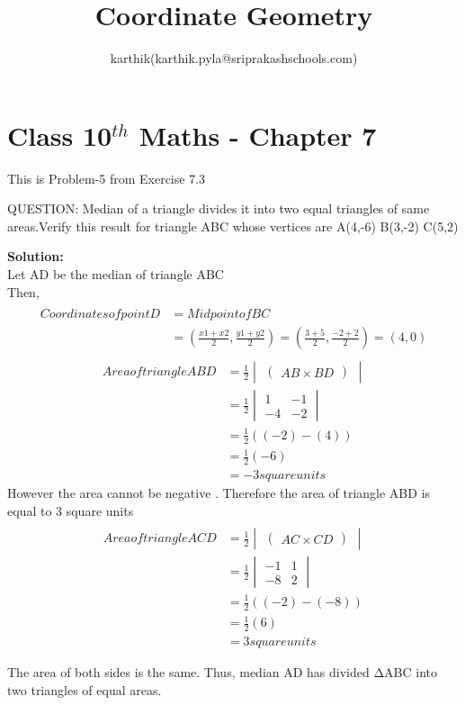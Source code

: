 \documentclass[12pt]{article}
\title{Coordinate Geometry}
\author{karthik(karthik.pyla@sriprakashschools.com)}
\newcommand{\myvec}[1]{\ensuremath{\begin{pmatrix}#1\end{pmatrix}}}
\newcommand{\mydet}[1]{\ensuremath{\begin{vmatrix}#1\end{vmatrix}}}
\newcommand{\solution}{\noindent \textbf{Solution: }}
\begin{document}
\maketitle
\section*{Class 10$^{th}$ Maths - Chapter 7}
This is Problem-5 from Exercise 7.3
\item  QUESTION: Median of a triangle divides it into two equal triangles of same areas.Verify this result for triangle ABC whose vertices are A(4,-6) B(3,-2) C(5,2)




\solution \\
Let AD be the median of triangle ABC\\
Then,
\begin{align}
\\Coordinates of point D &= Midpoint of BC\\    
&=\left(\frac{x1+x2}{2},\frac{y1+y2}{2}\right)
=\left(\frac{3+5}{2},\frac{-2+2}{2}\right)=(4,0)
\end{align}
\begin{align}
\\Area of triangle ABD&=\frac{1}{2}\mydet{ \myvec {AB\times BD}}\\&=\frac{1}{2}\mydet{ {1}&{-1} \\{-4}&{-2}}\\ &=\frac{1}{2}\left((-2)-(4)\right)\\&=\frac{1}{2}(-6)\\&=-3 square units
\end{align}
However the area cannot be negative . Therefore the area of triangle ABD is equal to 3 square units
\begin{align}
\\Area of triangle ACD&=\frac{1}{2}\mydet{ \myvec {AC\times CD}}\\&=\frac{1}{2}\mydet{ {-1}&{1} \\{-8}&{2}}\\ &=\frac{1}{2}\left((-2)-(-8)\right)\\&=\frac{1}{2}(6)\\&=3 square units
\end{align}

The area of both sides is the same. Thus, median AD has divided ΔABC into two triangles of equal areas.
\end{document}
